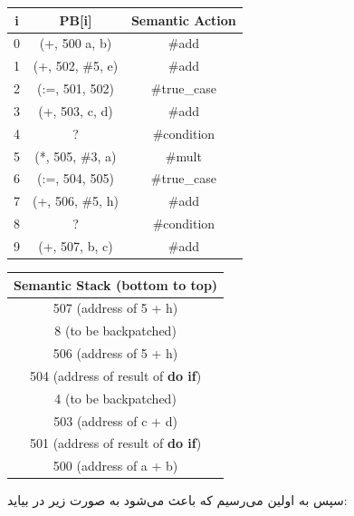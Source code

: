 \documentclass[]{article}
\begin{document}
\begin{latin}
\centering
\begin{tabular}{|c|c|c|}
    \hline
    i & PB[i] & Semantic Action\\
    \hline
    0 & (+, 500 a, b) & \#add\\
    1 & (+, 502, \#5, e) & \#add\\
    2 & (:=, 501, 502) & \#true\_case\\
    3 & (+, 503, c, d) & \#add\\
    4 & ? & \#condition\\
    5 & (*, 505, \#3, a) & \#mult\\
    6 & (:=, 504, 505) & \#true\_case\\
    7 & (+, 506, \#5, h) & \#add\\
    8 & ? & \#condition\\
    9 & (+, 507, b, c) & \#add\\
    \hline
\end{tabular}
\begin{tabular}{|c|}
    \hline
    Semantic Stack (bottom to top)\\
    \hline
    507 (address of 5 + h)\\
    \hline
    8 (to be backpatched)\\
    \hline
    506 (address of 5 + h)\\
    \hline
    504 (address of result of \textbf{do if})\\
    \hline
    4 (to be backpatched)\\
    \hline
    503 (address of c + d)\\
    \hline
    501 (address of result of \textbf{do if})\\
    \hline
    500 (address of a + b)\\
    \hline
\end{tabular}
\end{latin}
سپس به اولین
می‌رسیم که باعث می‌شود به صورت زیر در بیاید:
\end{document}
